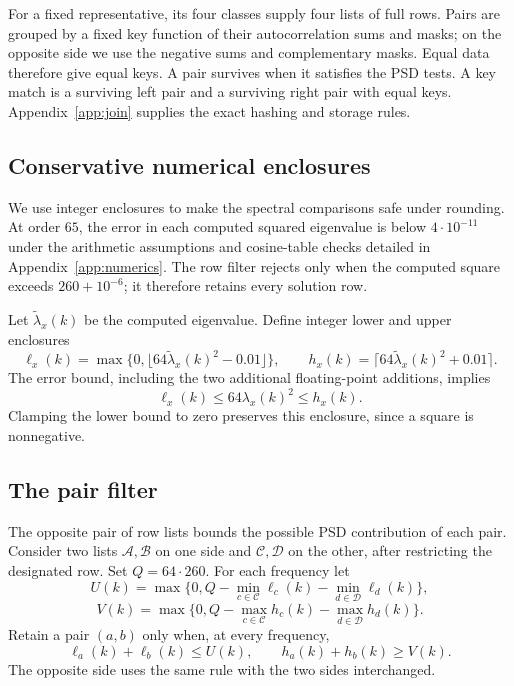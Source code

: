 \documentclass[11pt]{article}
\begin{document}
For a fixed representative, its four classes supply four lists of full
rows. Pairs are grouped by a fixed key function of their autocorrelation
sums and masks; on the opposite side we use the negative sums and
complementary masks. Equal data therefore give equal keys. A pair survives when it satisfies
the PSD tests. A key match is a surviving left pair and a surviving right
pair with equal keys. Appendix~\ref{app:join} supplies the exact hashing
and storage rules.

\subsection{Conservative numerical enclosures}\label{sec:arithmetic}
We use integer enclosures to make the spectral comparisons safe under
rounding. At order $65$, the error in each computed squared eigenvalue is
below $4\cdot10^{-11}$ under the arithmetic assumptions and cosine-table
checks detailed in Appendix~\ref{app:numerics}. The row filter rejects only
when the computed square exceeds $260+10^{-6}$; it therefore retains
every solution row.

Let $\widetilde\lambda_x(k)$ be the computed eigenvalue. Define integer
lower and upper enclosures
\[
 \ell_x(k)=\max\{0,\lfloor64\widetilde\lambda_x(k)^2-0.01\rfloor\},
 \qquad
 h_x(k)=\lceil64\widetilde\lambda_x(k)^2+0.01\rceil.
\]
The error bound, including the two additional floating-point additions,
implies
\begin{equation}\label{eq:enclosure}
 \ell_x(k)\leq64\lambda_x(k)^2\leq h_x(k).
\end{equation}
Clamping the lower bound to zero preserves this enclosure, since a square
is nonnegative.

\subsection{The pair filter}
The opposite pair of row lists bounds the possible PSD contribution of each pair. Consider two lists $\mathcal A,\mathcal B$ on one side and
$\mathcal C,\mathcal D$ on the other, after restricting the designated row.
Set $Q=64\cdot260$. For each frequency let
\[
 U(k)=\max\{0,Q-\min_{c\in\mathcal C}\ell_c(k)
                    -\min_{d\in\mathcal D}\ell_d(k)\},
\]
\[
 V(k)=\max\{0,Q-\max_{c\in\mathcal C}h_c(k)
                    -\max_{d\in\mathcal D}h_d(k)\}.
\]
Retain a pair $(a,b)$ only when, at every frequency,
\begin{equation}\label{eq:pair}
 \ell_a(k)+\ell_b(k)\leq U(k),\qquad
 h_a(k)+h_b(k)\geq V(k).
\end{equation}
The opposite side uses the same rule with the two sides interchanged.
\end{document}
